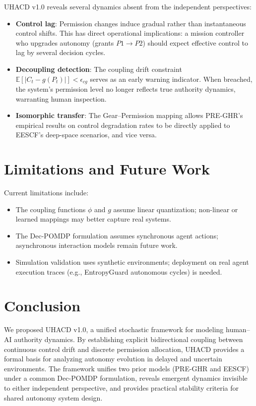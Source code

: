 \documentclass[conference]{IEEEtran}
\begin{document}
UHACD v1.0 reveals several dynamics absent from the independent perspectives:

\begin{itemize}
\item \textbf{Control lag}: Permission changes induce gradual rather than instantaneous control shifts. This has direct operational implications: a mission controller who upgrades autonomy (grants $P1 \to P2$) should expect effective control to lag by several decision cycles.
\item \textbf{Decoupling detection}: The coupling drift constraint $\mathbb{E}[|C_t - g(P_t)|] < \epsilon_{cg}$ serves as an early warning indicator. When breached, the system's permission level no longer reflects true authority dynamics, warranting human inspection.
\item \textbf{Isomorphic transfer}: The Gear--Permission mapping allows PRE-GHR's empirical results on control degradation rates to be directly applied to EESCF's deep-space scenarios, and vice versa.
\end{itemize}

\section{Limitations and Future Work}

Current limitations include:
\begin{itemize}
\item The coupling functions $\phi$ and $g$ assume linear quantization; non-linear or learned mappings may better capture real systems.
\item The Dec-POMDP formulation assumes synchronous agent actions; asynchronous interaction models remain future work.
\item Simulation validation uses synthetic environments; deployment on real agent execution traces (e.g., EntropyGuard autonomous cycles) is needed.
\end{itemize}

\section{Conclusion}

We proposed UHACD v1.0, a unified stochastic framework for modeling human--AI authority dynamics. By establishing explicit bidirectional coupling between continuous control drift and discrete permission allocation, UHACD provides a formal basis for analyzing autonomy evolution in delayed and uncertain environments. The framework unifies two prior models (PRE-GHR and EESCF) under a common Dec-POMDP formulation, reveals emergent dynamics invisible to either independent perspective, and provides practical stability criteria for shared autonomy system design.
\end{document}
